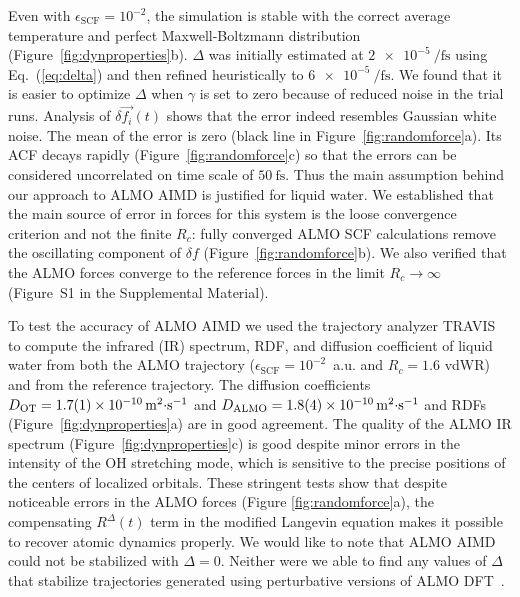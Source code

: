 \documentclass[aps,prl,reprint,amsmath,amssymb]{revtex4-1}
\begin{document}
Even with $\epsilon_{\text{SCF}} = 10^{-2}$, the simulation is stable with the correct average temperature and perfect Maxwell-Boltzmann distribution (Figure~\ref{fig:dynproperties}b). $\Delta$ was initially estimated at $\SI{2e-5}{\per\fs}$ using Eq.~(\ref{eq:delta}) and then refined heuristically to $\SI{6e-5}{\per\fs}$. 
We found that it is easier to optimize $\Delta$ when $\gamma$ is set to zero because of reduced noise in the trial runs. 
%
Analysis of $\delta \vec{f_{i}}(t)$ shows that the error indeed resembles Gaussian white noise. The mean of the error is zero (black line in Figure~\ref{fig:randomforce}a). Its ACF decays rapidly (Figure~\ref{fig:randomforce}c) so that the errors can be considered uncorrelated on time scale of $\SI{50}{\fs}$. Thus the main assumption behind our approach to ALMO AIMD is justified for liquid water. We established that the main source of error in forces for this system is the loose convergence criterion and not the finite $R_c$: fully converged ALMO SCF calculations remove the oscillating component of $\delta f$ (Figure~\ref{fig:randomforce}b). We also verified that the ALMO forces converge to the reference forces in the limit $R_{c} \rightarrow \infty$ 
(Figure~S1 in the Supplemental Material).



To test the accuracy of ALMO AIMD we used the trajectory analyzer TRAVIS~\cite{a:travis-main} to compute the infrared (IR) spectrum, RDF, and diffusion coefficient of liquid water from both the ALMO trajectory ($\epsilon_{\text{SCF}} = 10^{-2}$~a.u. and $R_{c} = 1.6$ vdWR) and from the reference trajectory. 
The diffusion coefficients $D_{\text{OT}}=\SI{1.7\pm0.1E-10}{\m^{2}\cdot\s^{-1}}$ and $D_{\text{ALMO}}=\SI{1.8\pm0.4E-10}{\m^{2}\cdot\s^{-1}}$ and RDFs (Figure~\ref{fig:dynproperties}a) are in good agreement. The quality of the ALMO IR spectrum (Figure~\ref{fig:dynproperties}c) is good despite minor errors in the intensity of the OH stretching mode, which is sensitive to the precise positions of the centers of localized orbitals. These stringent tests show that despite noticeable errors in the ALMO forces (Figure \ref{fig:randomforce}a), the compensating $R^{\Delta}(t)$ term in the modified Langevin equation makes it possible to recover atomic dynamics properly. We would like to note that ALMO AIMD could not be stabilized with $\Delta=0$. Neither were we able to find any values of $\Delta$ that stabilize trajectories generated using perturbative versions of ALMO DFT~\cite{a:almo-ls}.
\end{document}
